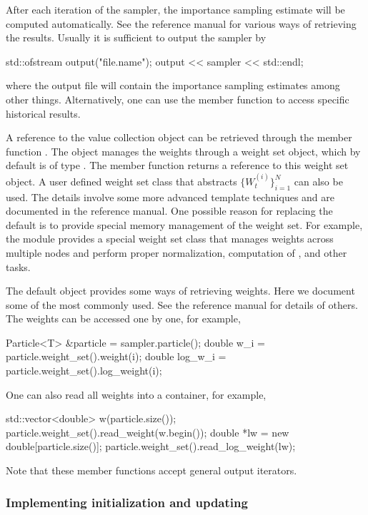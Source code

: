 \documentclass[11pt, fontset=Minion, showoverfull,
bib, biblatexstyle=numeric, mintcode, minted=cache]{marticle}
\begin{document}
After each iteration of the sampler, the importance sampling estimate will be
computed automatically. See the reference manual for various ways of
retrieving the results. Usually it is sufficient to output the sampler by
\begin{cppcode}
std::ofstream output("file.name");
output << sampler << std::endl;
\end{cppcode}
where the output file will contain the importance sampling estimates among
other things. Alternatively, one can use the 
member function to access specific historical results.

A reference to the value collection  object can be retrieved
through the member function . The
 object manages the weights through a weight set
object, which by default is of type . The
 member function returns a reference to
this weight set object. A user defined weight set class that abstracts
$\{W_t^{(i)}\}_{i=1}^N$ can also be used. The details involve some more
advanced \cpp template techniques and are documented in the reference manual.
One possible reason for replacing the default is to provide special memory
management of the weight set. For example, the \mpi module provides a special
weight set class that manages weights across multiple nodes and perform proper
normalization, computation of \ess, and other tasks.

The default  object provides some ways of retrieving
weights.  Here we document some of the most commonly used. See the reference
manual for details of others. The weights can be accessed one by one, for
example,
\begin{cppcode}
Particle<T> &particle = sampler.particle();
double w_i     = particle.weight_set().weight(i);
double log_w_i = particle.weight_set().log_weight(i);
\end{cppcode}
One can also read all weights into a container, for example,
\begin{cppcode}
std::vector<double> w(particle.size());
particle.weight_set().read_weight(w.begin());
double *lw = new double[particle.size()];
particle.weight_set().read_log_weight(lw);
\end{cppcode}
Note that these member functions accept general output iterators.

\subsubsection{Implementing initialization and updating}
\end{document}

